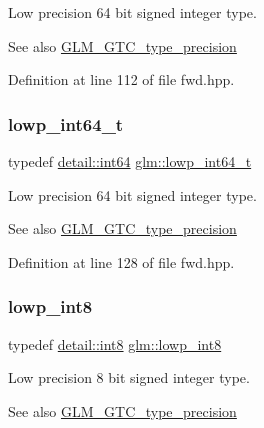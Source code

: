 Low precision 64 bit signed integer type. \begin{DoxySeeAlso}{See also}
\mbox{\hyperlink{group__gtc__type__precision}{G\+L\+M\+\_\+\+G\+T\+C\+\_\+type\+\_\+precision}} 
\end{DoxySeeAlso}


Definition at line 112 of file fwd.\+hpp.

\mbox{\label{group__gtc__type__precision_ga14d72e76d57c7f28eca8e933816c9fd6}} 
\subsubsection{\texorpdfstring{lowp\_int64\_t}{lowp\_int64\_t}}
{\footnotesize\ttfamily typedef \mbox{\hyperlink{namespaceglm_1_1detail_a5b1c3227ec636c24a0676746381adfc8}{detail\+::int64}} \mbox{\hyperlink{group__gtc__type__precision_ga14d72e76d57c7f28eca8e933816c9fd6}{glm\+::lowp\+\_\+int64\+\_\+t}}}

Low precision 64 bit signed integer type. \begin{DoxySeeAlso}{See also}
\mbox{\hyperlink{group__gtc__type__precision}{G\+L\+M\+\_\+\+G\+T\+C\+\_\+type\+\_\+precision}} 
\end{DoxySeeAlso}


Definition at line 128 of file fwd.\+hpp.

\mbox{\label{group__gtc__type__precision_gaf9e675b6392764242ae87eb179e9d3d6}} 
\subsubsection{\texorpdfstring{lowp\_int8}{lowp\_int8}}
{\footnotesize\ttfamily typedef \mbox{\hyperlink{namespaceglm_1_1detail_a04b526a8d7a9b455602a0afa78c531e0}{detail\+::int8}} \mbox{\hyperlink{group__gtc__type__precision_gaf9e675b6392764242ae87eb179e9d3d6}{glm\+::lowp\+\_\+int8}}}

Low precision 8 bit signed integer type. \begin{DoxySeeAlso}{See also}
\mbox{\hyperlink{group__gtc__type__precision}{G\+L\+M\+\_\+\+G\+T\+C\+\_\+type\+\_\+precision}} 
\end{DoxySeeAlso}



